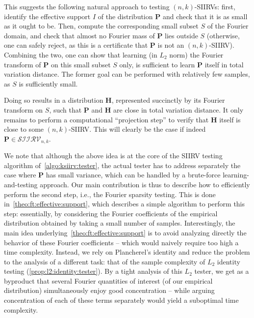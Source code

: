 \documentclass[11pt]{article}
\theoremstyle{definition}
\newcommand{\p}{\mathbf{P}}
\newcommand{\h}{\mathbf{H}}
\newcommand{\classksiirv}[2][n]{\ensuremath{\mathcal{SIIRV}_{#1,#2}}\xspace}
\begin{document}
This suggests the following natural approach to testing $(n,k)$-SIIRVs: first, identify the effective support $I$ of the distribution $\p$ 
and check that it is as small as it ought to be. Then, compute the corresponding small subset $S$ of the Fourier domain, 
and check that almost no Fourier mass of $\p$ lies outside $S$ (otherwise, one can safely reject, as this is a certificate that $\p$ is not an $(n,k)$-SIIRV). 
Combining the two, one can show that learning (in $L_2$ norm) the Fourier transform of $\p$ on this small subset $S$ only, 
is sufficient to learn $\p$ itself in total variation distance. The former goal can be performed with relatively few samples, as $S$ is sufficiently small.

Doing so results in a distribution $\h$, represented succinctly by its Fourier transform on $S$, such that $\p$ and $\h$ are close in total variation distance. 
It only remains to perform a computational ``projection step'' to verify that $\h$ itself is close to some $(n,k)$-SIIRV. 
This will clearly be the case if indeed $\p\in\classksiirv[n]{k}$.

We note that although the above idea is at the core of the SIIRV testing algorithm of~\cref{algo:ksiirv:tester}, 
the actual tester has to address separately the case where $\p$ has small variance, which can be handled by a brute-force learning-and-testing approach. 
Our main contribution is thus to describe how to efficiently perform the second step, i.e., the Fourier sparsity testing. 
This is done in~\cref{theo:ft:effective:support}, which describes a simple algorithm to perform this step: essentially, by considering the Fourier coefficients 
of the empirical distribution obtained by taking a small number of samples. Interestingly, the main idea underlying~\cref{theo:ft:effective:support} 
is to avoid analyzing directly the behavior of these Fourier coefficients -- which would naively require too high a time complexity. 
Instead, we rely on Plancherel's identity and reduce the problem to the analysis of a different task:  
that of the sample complexity of $L_2$ identity testing (\cref{prop:l2:identity:tester}). By a tight analysis of this $L_2$ tester, 
we get as a byproduct that several Fourier quantities of interest (of our empirical distribution) simultaneously enjoy 
good concentration -- while arguing concentration of each of these terms separately would yield a suboptimal time complexity. 
\end{document}
